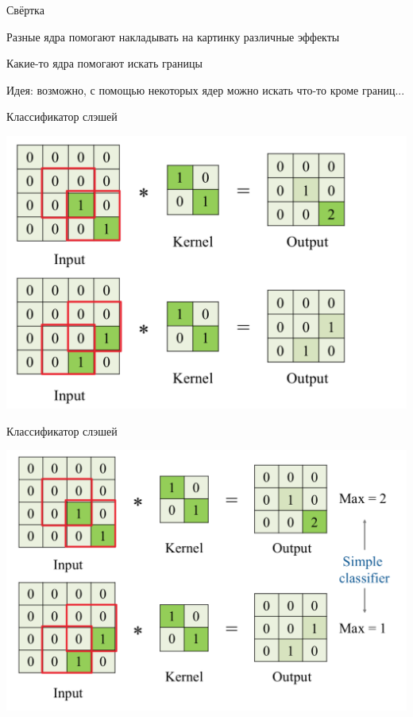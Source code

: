 \documentclass[notes,12pt, aspectratio=169]{beamer}
\newenvironment{wideitemize}{\itemize\addtolength{\itemsep}{10pt}}{\enditemize}
\begin{document}
\begin{frame}{Свёртка}
\begin{wideitemize}
	\item Разные ядра помогают накладывать на картинку различные эффекты
	\item Какие-то ядра помогают искать границы
	\item \alert{Идея:} возможно, с помощью некоторых ядер можно искать что-то кроме границ...
\end{wideitemize}
\end{frame}


\begin{frame}{Классификатор слэшей}
\begin{center}
	\includegraphics[width=.75\linewidth]{conv_1.png}
\end{center}
\end{frame}


\begin{frame}{Классификатор слэшей}
\begin{center}
	\includegraphics[width=.8\linewidth]{conv_2.png}
\end{center}
\end{frame}
\end{document}
